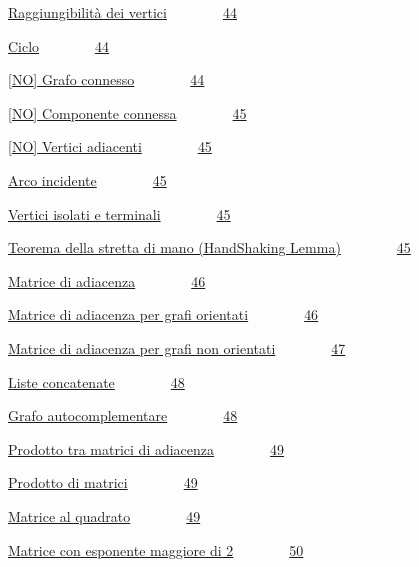 \documentclass{article}
\begin{document}
{\protect\hyperlink{h.4bm9pdnjdb2q}{Raggiungibilità dei
vertici}}{~~~~~~~~}{\protect\hyperlink{h.4bm9pdnjdb2q}{44}}

{\protect\hyperlink{h.4fm287mz4am5}{Ciclo}}{~~~~~~~~}{\protect\hyperlink{h.4fm287mz4am5}{44}}

{\protect\hyperlink{h.rpdf8j1vq7g0}{{[}NO{]} Grafo
connesso}}{~~~~~~~~}{\protect\hyperlink{h.rpdf8j1vq7g0}{44}}

{\protect\hyperlink{h.iejp6ankfctp}{{[}NO{]} Componente
connessa}}{~~~~~~~~}{\protect\hyperlink{h.iejp6ankfctp}{45}}

{\protect\hyperlink{h.5nknzat57p06}{{[}NO{]} Vertici
adiacenti}}{~~~~~~~~}{\protect\hyperlink{h.5nknzat57p06}{45}}

{\protect\hyperlink{h.52hqmabofvh0}{Arco
incidente}}{~~~~~~~~}{\protect\hyperlink{h.52hqmabofvh0}{45}}

{\protect\hyperlink{h.vm6z084zc6rf}{Vertici isolati e
terminali}}{~~~~~~~~}{\protect\hyperlink{h.vm6z084zc6rf}{45}}

{\protect\hyperlink{h.d1yeo9bkhutt}{Teorema della stretta di mano
(HandShaking Lemma)}}{~~~~~~~~}{\protect\hyperlink{h.d1yeo9bkhutt}{45}}

{\protect\hyperlink{h.viqjw1dxzez8}{Matrice di
adiacenza}}{~~~~~~~~}{\protect\hyperlink{h.viqjw1dxzez8}{46}}

{\protect\hyperlink{h.30h8k4akc7l}{Matrice di adiacenza per grafi
orientati}}{~~~~~~~~}{\protect\hyperlink{h.30h8k4akc7l}{46}}

{\protect\hyperlink{h.iuwxcos21awu}{Matrice di adiacenza per grafi non
orientati}}{~~~~~~~~}{\protect\hyperlink{h.iuwxcos21awu}{47}}

{\protect\hyperlink{h.qwq1tiruc9xg}{Liste
concatenate}}{~~~~~~~~}{\protect\hyperlink{h.qwq1tiruc9xg}{48}}

{\protect\hyperlink{h.tsrwv4qy0dku}{Grafo
autocomplementare}}{~~~~~~~~}{\protect\hyperlink{h.tsrwv4qy0dku}{48}}

{\protect\hyperlink{h.akx1r9fzvwzo}{Prodotto tra matrici di
adiacenza}}{~~~~~~~~}{\protect\hyperlink{h.akx1r9fzvwzo}{49}}

{\protect\hyperlink{h.c39ti8il3qtf}{Prodotto di
matrici}}{~~~~~~~~}{\protect\hyperlink{h.c39ti8il3qtf}{49}}

{\protect\hyperlink{h.md5vuljp7xm}{Matrice al
quadrato}}{~~~~~~~~}{\protect\hyperlink{h.md5vuljp7xm}{49}}

{\protect\hyperlink{h.yvqsj238z2mk}{Matrice con esponente maggiore di
2}}{~~~~~~~~}{\protect\hyperlink{h.yvqsj238z2mk}{50}}
\end{document}
